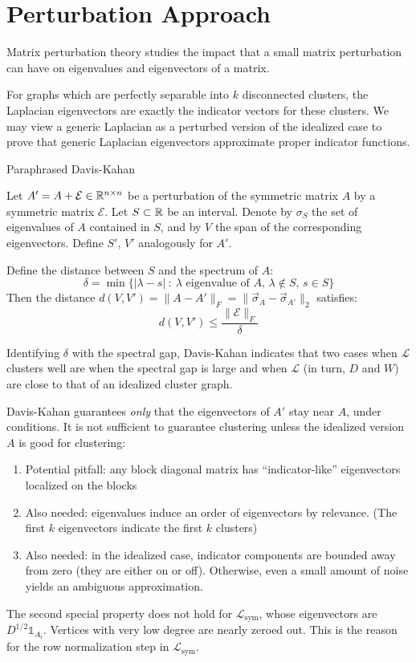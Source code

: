 \documentclass{article}
\newcommand{\an}[1]{{\leavevmode\color{red}{#1}}}
\begin{document}
\section{Perturbation Approach}
Matrix perturbation theory studies the impact that a small matrix perturbation can have on eigenvalues and eigenvectors of a matrix. 

For graphs which are perfectly separable into $k$ disconnected clusters, the Laplacian eigenvectors are exactly the indicator vectors for these clusters. We may view a generic Laplacian as a perturbed version of the idealized case to prove that generic Laplacian eigenvectors approximate proper indicator functions.

\begin{theorem}{Paraphrased Davis-Kahan}
 
Let $A' = A + \mathcal{E} \in {\mathbb R}^{n \times n}$ be a perturbation of the symmetric matrix $A$ by a symmetric matrix $\mathcal{E}$. Let $S \subset {\mathbb R}$ be an interval. Denote by $\sigma_{S}$ the set of eigenvalues of $A$ contained in $S$, and by $V$ the span of the corresponding eigenvectors. Define $S'$, $V'$ analogously for $A'$. 

Define the distance between $S$ and the spectrum of $A$:
\begin{equation}
    \delta = \min\{ |\lambda - s | \ : \  \text{$\lambda$ eigenvalue of $A$, $\lambda \not \in S$, $s \in S$} \}
\end{equation}
Then the distance $d(V, V') = \|A - A'\|_F = \|\vec{\sigma}_A - \vec{\sigma}_{A'} \|_2$ satisfies:
\begin{equation}
    d(V, V') \leq \frac{\|\mathcal{E}\|_F}{\delta}
\end{equation}
\end{theorem}
Identifying $\delta$ with the spectral gap, Davis-Kahan indicates that two cases when $\mathcal{L}$ clusters well are when the spectral gap is large and when $\mathcal{L}$ (in turn, $D$ and $W$) are close to that of an idealized cluster graph. 
\an{Can you articulate this by melding graph language with the linear algebraic characterization above?}

Davis-Kahan guarantees \textit{only} that the eigenvectors of $A'$ stay near $A$, under conditions. It is not sufficient to guarantee clustering unless the idealized version $A$ is good for clustering:
\begin{enumerate}
    \item Potential pitfall: any block diagonal matrix has ``indicator-like'' eigenvectors localized on the blocks
    \item Also needed: eigenvalues induce an order of eigenvectors by relevance. (The first $k$ eigenvectors indicate the first $k$ clusters)
    \item Also needed: in the idealized case, indicator components are bounded away from zero (they are either on or off). Otherwise, even a small amount of noise yields an ambiguous approximation.
\end{enumerate}
The second special property does not hold for $\mathcal{L}_{\text{sym}}$, whose eigenvectors are $D^{1/2} \mathds{1}_{A_i}$. Vertices with very low degree are nearly zeroed out. This is the reason for the row normalization step in $\mathcal{L}_{\text{sym}}$.
\newpage

\end{document}
